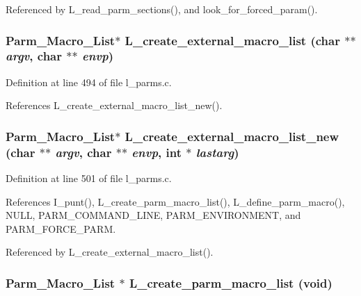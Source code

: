 Referenced by L\_\-read\_\-parm\_\-sections(), and look\_\-for\_\-forced\_\-param().
\subsubsection{\setlength{\rightskip}{0pt plus 5cm}\bf{Parm\_\-Macro\_\-List}$\ast$ L\_\-create\_\-external\_\-macro\_\-list (char $\ast$$\ast$ {\em argv}, char $\ast$$\ast$ {\em envp})}\label{l__parms_8c_d9f32fd872ba5e0db56034e0206c9b3c}




Definition at line 494 of file l\_\-parms.c.

References L\_\-create\_\-external\_\-macro\_\-list\_\-new().
\subsubsection{\setlength{\rightskip}{0pt plus 5cm}\bf{Parm\_\-Macro\_\-List}$\ast$ L\_\-create\_\-external\_\-macro\_\-list\_\-new (char $\ast$$\ast$ {\em argv}, char $\ast$$\ast$ {\em envp}, int $\ast$ {\em lastarg})}\label{l__parms_8c_70d45efecd0f0c73d94d1b51865be730}




Definition at line 501 of file l\_\-parms.c.

References I\_\-punt(), L\_\-create\_\-parm\_\-macro\_\-list(), L\_\-define\_\-parm\_\-macro(), NULL, PARM\_\-COMMAND\_\-LINE, PARM\_\-ENVIRONMENT, and PARM\_\-FORCE\_\-PARM.

Referenced by L\_\-create\_\-external\_\-macro\_\-list().
\subsubsection{\setlength{\rightskip}{0pt plus 5cm}\bf{Parm\_\-Macro\_\-List} $\ast$ L\_\-create\_\-parm\_\-macro\_\-list (void)}\label{l__parms_8c_c192c48345f8281ee12dbeabb46b8185}




